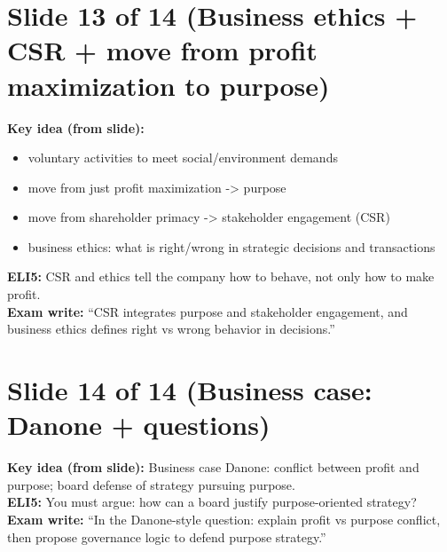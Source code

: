 \documentclass[11pt,a4paper]{article}
\begin{document}
\section*{Slide 13 of 14 (Business ethics + CSR + move from profit maximization to purpose)}
\textbf{Key idea (from slide):}
\begin{itemize}
  \item voluntary activities to meet social/environment demands
  \item move from just profit maximization -> purpose
  \item move from shareholder primacy -> stakeholder engagement (CSR)
  \item business ethics: what is right/wrong in strategic decisions and transactions
\end{itemize}
\textbf{ELI5:} CSR and ethics tell the company how to behave, not only how to make profit.\\
\textbf{Exam write:} ``CSR integrates purpose and stakeholder engagement, and business ethics defines right vs wrong behavior in decisions.''

\section*{Slide 14 of 14 (Business case: Danone + questions)}
\textbf{Key idea (from slide):} Business case Danone: conflict between profit and purpose; board defense of strategy pursuing purpose.\\
\textbf{ELI5:} You must argue: how can a board justify purpose-oriented strategy?\\
\textbf{Exam write:} ``In the Danone-style question: explain profit vs purpose conflict, then propose governance logic to defend purpose strategy.''
\end{document}
